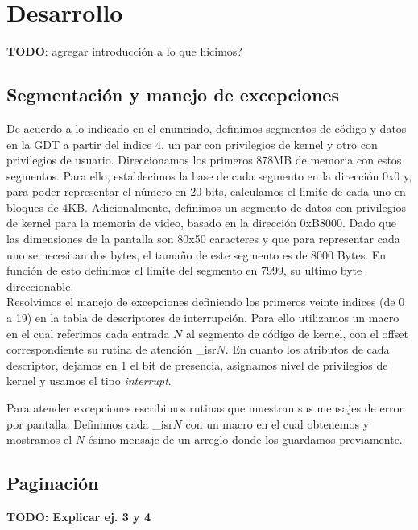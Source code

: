 \section{Desarrollo}

\textbf{TODO}: agregar introducción a lo que hicimos?

\subsection{Segmentación y manejo de excepciones}

De acuerdo a lo indicado en el enunciado, definimos segmentos de código y datos en la GDT a partir del indice 4, un par con privilegios de kernel y otro con privilegios de usuario. 
Direccionamos los primeros $878$MB de memoria con estos segmentos.
Para ello, establecimos la base de cada segmento en la dirección 0x0 y, para poder representar el número en 20 bits, calculamos el limite de cada uno en bloques de 4KB. 
Adicionalmente, definimos un segmento de datos con privilegios de kernel para la memoria de video, basado en la dirección 0xB8000. Dado que las dimensiones de la pantalla son 80x50 caracteres y que para representar cada uno se necesitan dos bytes, el tamaño de este segmento es de 8000 Bytes. En función de esto definimos el limite del segmento en 7999, su ultimo byte direccionable.\\

Resolvimos el manejo de excepciones definiendo los primeros veinte indices (de 0 a 19) en la tabla de descriptores de interrupción. 
Para ello utilizamos un macro en el cual referimos cada entrada $N$ al segmento de código de kernel, con el offset correspondiente su rutina de atención \_isr$N$. 
En cuanto los atributos de cada descriptor, dejamos en 1 el bit de presencia, asignamos nivel de privilegios de kernel y usamos el tipo \textit{interrupt}.

Para atender excepciones escribimos rutinas que muestran sus mensajes de error por pantalla.
Definimos cada \_isr$N$ con un macro en el cual obtenemos y mostramos el $N$-ésimo mensaje de un arreglo donde los guardamos previamente.\\


\subsection{Paginación}

\textbf{TODO: Explicar ej. 3 y 4}

